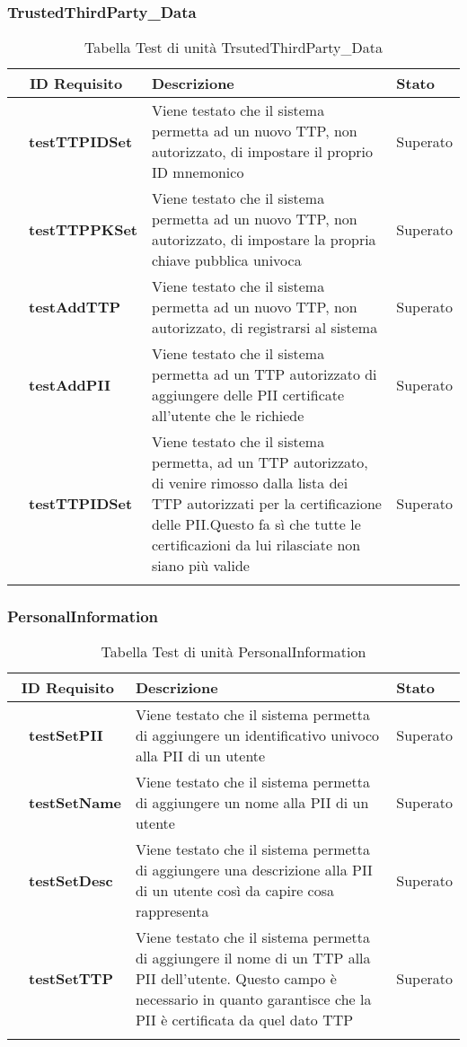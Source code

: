 \subsubsection{TrustedThirdParty\_Data}
\begin{longtable}{|r l|p{10cm}|p{2cm}|}
	\hline
	\multicolumn{2}{|c|}{\textbf{ID Requisito}} & \textbf{Descrizione} & \textbf{Stato}\tabularnewline
	\hline
	&\textbf{testTTPIDSet}&Viene testato che il sistema permetta ad un nuovo \gls{TTP}, non autorizzato, di impostare il proprio ID mnemonico & Superato\\\hline
	&\textbf{testTTPPKSet}&Viene testato che il sistema permetta ad un nuovo \gls{TTP}, non autorizzato, di impostare la propria chiave pubblica univoca & Superato\\\hline
	&\textbf{testAddTTP}&Viene testato che il sistema permetta ad un nuovo TTP, non autorizzato, di registrarsi al sistema& Superato\\\hline
	&\textbf{testAddPII}&Viene testato che il sistema permetta ad un \gls{TTP} autorizzato di aggiungere delle \gls{PII} certificate all'utente che le richiede& Superato\\\hline
	&\textbf{testTTPIDSet}&Viene testato che il sistema permetta, ad un \gls{TTP} autorizzato, di venire rimosso dalla lista dei \gls{TTP} autorizzati per la certificazione delle \gls{PII}.Questo fa sì che tutte le certificazioni da lui rilasciate non siano più valide& Superato\\\hline
	\caption{Tabella Test di unità TrsutedThirdParty\_Data}
\end{longtable}
\subsubsection{PersonalInformation}
\begin{longtable}{|r l|p{10cm}|p{2cm}|}
	\hline
	\multicolumn{2}{|c|}{\textbf{ID Requisito}} & \textbf{Descrizione} & \textbf{Stato}\tabularnewline
	\hline
	&\textbf{testSetPII}&Viene testato che il sistema permetta di aggiungere un identificativo univoco alla \gls{PII} di un utente& Superato\\\hline
	&\textbf{testSetName}&Viene testato che il sistema permetta di aggiungere un nome alla \gls{PII} di un utente& Superato\\\hline
	&\textbf{testSetDesc}&Viene testato che il sistema permetta di aggiungere una descrizione alla \gls{PII} di un utente così da capire cosa rappresenta& Superato\\\hline
	&\textbf{testSetTTP}&Viene testato che il sistema permetta di aggiungere il nome di un \gls{TTP} alla \gls{PII} dell'utente. Questo campo è necessario in quanto garantisce che la \gls{PII} è certificata da quel dato \gls{TTP}& Superato\\\hline
	\caption{Tabella Test di unità PersonalInformation}
\end{longtable}
